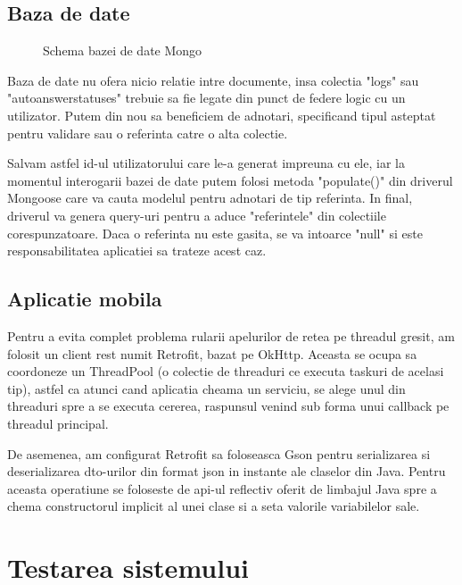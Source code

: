 \subsection {Baza de date}

\begin{figure}[h!]
  \centering
  \caption{Schema bazei de date Mongo}
\end{figure}

Baza de date nu ofera nicio relatie intre documente, insa colectia "logs" sau "autoanswerstatuses" trebuie sa fie legate din punct de federe logic cu un utilizator. Putem din nou sa beneficiem de adnotari, specificand tipul asteptat pentru validare sau o referinta catre o alta colectie.

Salvam astfel id-ul utilizatorului care le-a generat impreuna cu ele, iar la momentul interogarii bazei de date putem folosi metoda "populate()" din driverul Mongoose care va cauta modelul pentru adnotari de tip referinta. In final, driverul va genera query-uri pentru a aduce "referintele" din colectiile corespunzatoare. Daca o referinta nu este gasita, se va intoarce "null" si este responsabilitatea aplicatiei sa trateze acest caz. 

\subsection {Aplicatie mobila}

Pentru a evita complet problema rularii apelurilor de retea pe threadul gresit, am folosit un client \acrshort{rest} numit Retrofit, bazat pe OkHttp. Aceasta se ocupa sa coordoneze un ThreadPool (o colectie de threaduri ce executa taskuri de acelasi tip), astfel ca atunci cand aplicatia cheama un serviciu, se alege unul din threaduri spre a se executa cererea, raspunsul venind sub forma unui callback pe threadul principal.

De asemenea, am configurat Retrofit sa foloseasca Gson pentru serializarea si deserializarea \acrshort{dto}-urilor din format \acrshort{json} in instante ale claselor din Java. Pentru aceasta operatiune se foloseste de \acrshort{api}-ul reflectiv oferit de limbajul Java spre a chema constructorul implicit al unei clase si a seta valorile variabilelor sale.

\section {Testarea sistemului}

